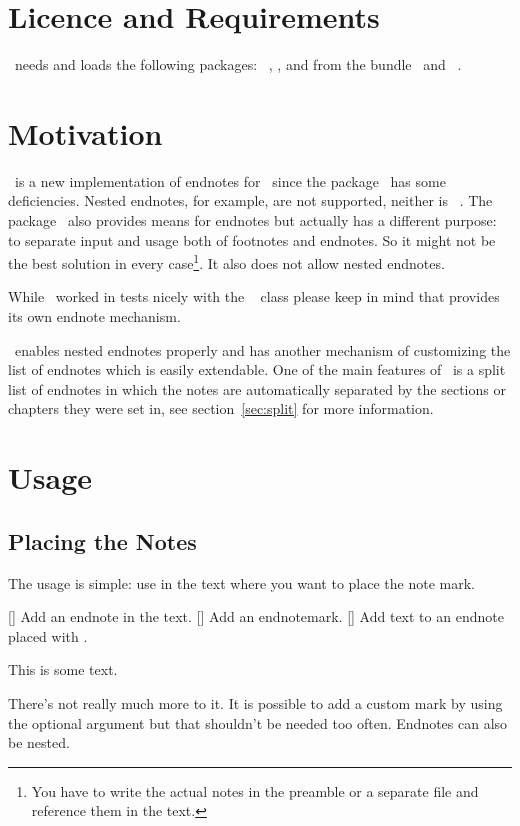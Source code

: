\documentclass[load-preamble+]{cnltx-doc}
\begin{document}
\section{Licence and Requirements}
\license

\enotez\ needs and loads the following packages:
~\cite{bnd:l3kernel}, ,  and
 from the  bundle~\cite{bnd:l3packages} and
~\cite{pkg:translations}.

\section{Motivation}
\enotez\ is a new implementation of endnotes for \LaTeXe\ since the
 package~\cite{pkg:endnotes} has some deficiencies.  Nested
endnotes, for example, are not supported, neither is
~\cite{pkg:hyperref}.  The 
package~\cite{pkg:sepfootnotes} also provides means for endnotes but actually
has a different purpose: to separate input and usage both of footnotes and
endnotes.  So it might not be the best solution in every case\footnote{You
  have to write the actual notes in the preamble or a separate file and
  reference them in the text.}.  It also does not allow nested endnotes.

While \enotez\ worked in tests nicely with the
~\cite{cls:memoir} class please keep in mind that
 provides its own endnote mechanism.

\enotez\ enables nested endnotes properly and has another mechanism of
customizing the list of endnotes which is easily extendable.  One of the main
features of \enotez\ is a split list of endnotes in which the notes are
automatically separated by the sections or chapters they were set in, see
section~\ref{sec:split} for more information.

\section{Usage}
\subsection{Placing the Notes}
The usage is simple: use  in the text where you want to place the
note mark.
\begin{commands}
  []
    Add an endnote in the text.
  []
    Add an endnotemark.
  []
    Add text to an endnote placed with .
\end{commands}
\begin{example}
  This is some text.
\end{example}
There's not really much more to it.  It is possible to add a custom mark by
using the optional argument but that shouldn't be needed too often.  Endnotes
can also be nested.
\end{document}
